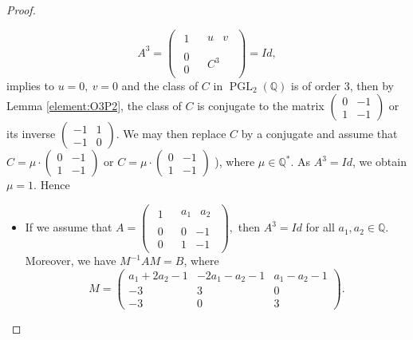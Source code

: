 \documentclass[leqno,12pt]{amsart} %
\newcommand{\Q}{\ensuremath{\mathbb{Q} }}
\DeclareMathOperator{\PGL}{PGL}
\begin{document}
\begin{proof}
\begin{itemize}
\[A^3=\left(
  \begin{array}{ccc}
\begin{matrix}
    1
\end{matrix}
&
\begin{matrix}
    u & v
\end{matrix}\\
\begin{matrix}
    0\\0
\end{matrix}&
\begin{matrix}
    C^3
\end{matrix}
\end{array}
\right)=Id,
\]
implies to $u=0,~v=0$ and the class of $C$ in $\PGL _2(\Q )$ is of order $3$, then by Lemma \ref{element:O3P2}, the class of $C$ is conjugate to the matrix $\left(\begin{matrix}
       0&-1\\1&-1 
    \end{matrix}\right)$ or its inverse $\left(\begin{array}{cc}
-1 & 1 
\\
 -1 & 0 
\end{array}\right)$. We may then replace $C$ by a conjugate and assume that $C= \mu\cdot\left(\begin{matrix}
       0&-1\\1&-1 
    \end{matrix}\right)$ or $C=\mu\cdot\left(\begin{matrix}
       0&-1\\1&-1 
    \end{matrix}\right)$ ), where $\mu\in\Q^*$. As $A^3=Id$, we obtain $\mu=1$. Hence 
    
    \begin{itemize}
        \item [(b.1.1)] If we assume that
$A=\left(
  \begin{array}{ccc}
\begin{matrix}
    1
\end{matrix}
&
\begin{matrix}
    a_{1} & a_{2}
\end{matrix}\\
\begin{matrix}
    0\\0
\end{matrix}&
\begin{matrix}
    0&-1\\1&-1
\end{matrix}
\end{array}
\right),
$ then $A^3=Id$ for all $a_{1},a_{2}\in\Q $. Moreover, we have $M^{-1}AM=B$, where 
\[M=\left(\begin{array}{ccc}
a_{1}+2 a_{2}-1 & -2 a_{1}-a_{2}-1 & a_{1}-a_{2}-1 
\\
 -3 & 3 & 0 
\\
 -3 & 0 & 3 
\end{array}
\right).\]
 

\end{itemize}
\end{itemize}
\end{proof}
\end{document}
